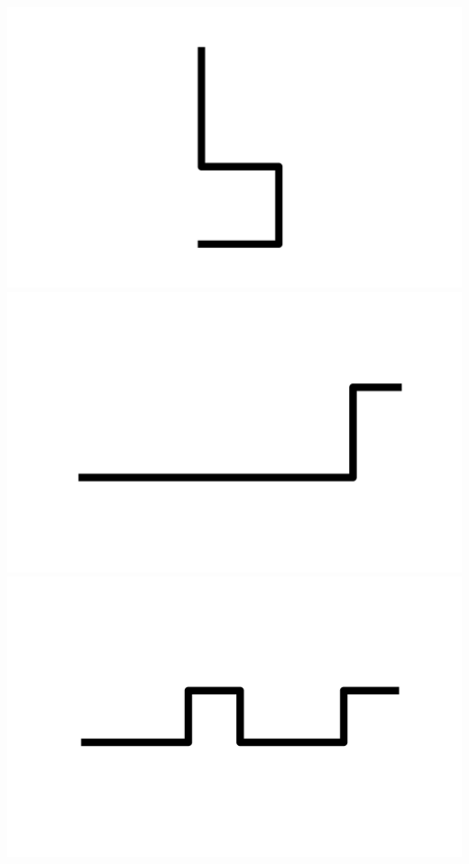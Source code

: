 \documentclass[]{report}
\begin{document}
\includegraphics[scale=.1]{pictures/21/state_cluster_shapes_352.pdf} 
\includegraphics[scale=.1]{pictures/21/state_cluster_shapes_353.pdf} 
\includegraphics[scale=.1]{pictures/21/state_cluster_shapes_354.pdf} 
\end{document}
